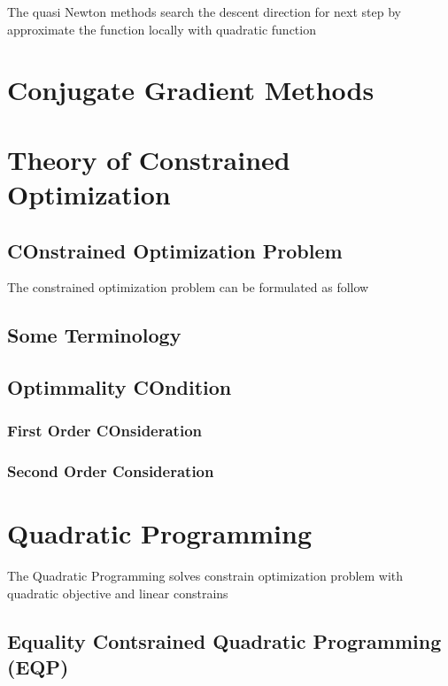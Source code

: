 \documentclass[
  letterpaper,
  DIV=11,
  numbers=noendperiod]{scrreprt}
\theoremstyle{definition}
\theoremstyle{plain}
\theoremstyle{plain}
\theoremstyle{definition}
\theoremstyle{plain}
\theoremstyle{plain}
\theoremstyle{remark}
\begin{document}
The quasi Newton methods search the descent direction for next step by
approximate the function locally with quadratic function

\chapter{Conjugate Gradient Methods}\label{conjugate-gradient-methods}

\chapter{Theory of Constrained
Optimization}\label{theory-of-constrained-optimization}

\section{COnstrained Optimization
Problem}\label{constrained-optimization-problem}

The constrained optimization problem can be formulated as follow

\section{Some Terminology}\label{some-terminology}

\section{Optimmality COndition}\label{optimmality-condition}

\subsection{First Order COnsideration}\label{first-order-consideration}

\subsection{Second Order
Consideration}\label{second-order-consideration}

\chapter{Quadratic Programming}\label{quadratic-programming}

The Quadratic Programming solves constrain optimization problem with
quadratic objective and linear constrains

\section{Equality Contsrained Quadratic Programming
(EQP)}\label{equality-contsrained-quadratic-programming-eqp}
\end{document}
